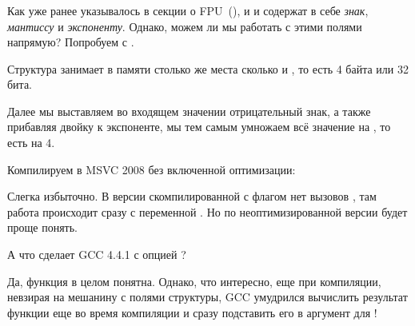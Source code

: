 \subsubsection{\WorkingWithFloatAsWithStructSubSubSectionName}
\label{sec:floatasstruct}

Как уже ранее указывалось в секции о FPU~(), 
и \Tfloat и \Tdouble содержат в себе \emph{знак}, \emph{мантиссу} и \emph{экспоненту}. 
Однако, можем ли мы работать с этими полями напрямую? Попробуем с \Tfloat.





Структура  занимает в памяти столько же места сколько и \Tfloat, 
то есть 4 байта или 32 бита.

Далее мы выставляем во входящем значении отрицательный знак, 
а также прибавляя двойку к экспоненте, мы тем 
самым умножаем всё значение на , то есть на 4.

Компилируем в MSVC 2008 без включенной оптимизации:



Слегка избыточно. В версии скомпилированной с флагом \Ox нет вызовов , 
там работа происходит сразу с переменной . Но по неоптимизированной версии будет проще понять.

А что сделает GCC 4.4.1 с опцией \Othree?



Да, функция \ttf в целом понятна. Однако, что интересно, еще при компиляции, 
невзирая на мешанину с полями структуры, GCC умудрился вычислить результат функции  еще
во время компиляции и сразу подставить его в аргумент для \printf{}!

